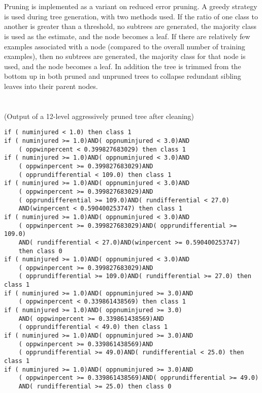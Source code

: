 \documentclass[11pt]{article}
\begin{document}
\section{}

Pruning is implemented as a variant on reduced error pruning. A greedy strategy is used during tree generation, with two methods used. If the ratio of one class  to another is greater than a threshold, no subtrees are generated, the majority class is used as the estimate, and the node becomes a leaf. If there are relatively few examples associated with a node (compared to the overall number of training examples), then no subtrees are generated, the majority class for that node is used, and the node becomes a leaf. In addition the tree is trimmed from the bottom up in both pruned and unpruned trees to collapse redundant sibling leaves into their parent nodes.

\section{}

(Output of a 12-level aggressively pruned tree after cleaning)
\begin{lstlisting}
if ( numinjured < 1.0) then class 1
if ( numinjured >= 1.0)AND( oppnuminjured < 3.0)AND
    ( oppwinpercent < 0.399827683029) then class 1
if ( numinjured >= 1.0)AND( oppnuminjured < 3.0)AND
    ( oppwinpercent >= 0.399827683029)AND
    ( opprundifferential < 109.0) then class 1
if ( numinjured >= 1.0)AND( oppnuminjured < 3.0)AND
    ( oppwinpercent >= 0.399827683029)AND
    ( opprundifferential >= 109.0)AND( rundifferential < 27.0)
    AND(winpercent < 0.590400253747) then class 1
if ( numinjured >= 1.0)AND( oppnuminjured < 3.0)AND
    ( oppwinpercent >= 0.399827683029)AND( opprundifferential >= 109.0)
    AND( rundifferential < 27.0)AND(winpercent >= 0.590400253747)
    then class 0
if ( numinjured >= 1.0)AND( oppnuminjured < 3.0)AND
    ( oppwinpercent >= 0.399827683029)AND
    ( opprundifferential >= 109.0)AND( rundifferential >= 27.0) then class 1
if ( numinjured >= 1.0)AND( oppnuminjured >= 3.0)AND
    ( oppwinpercent < 0.339861438569) then class 1
if ( numinjured >= 1.0)AND( oppnuminjured >= 3.0)
    AND( oppwinpercent >= 0.339861438569)AND
    ( opprundifferential < 49.0) then class 1
if ( numinjured >= 1.0)AND( oppnuminjured >= 3.0)AND
    ( oppwinpercent >= 0.339861438569)AND
    ( opprundifferential >= 49.0)AND( rundifferential < 25.0) then class 1
if ( numinjured >= 1.0)AND( oppnuminjured >= 3.0)AND
    ( oppwinpercent >= 0.339861438569)AND( opprundifferential >= 49.0)
    AND( rundifferential >= 25.0) then class 0
\end{lstlisting}
\end{document}
